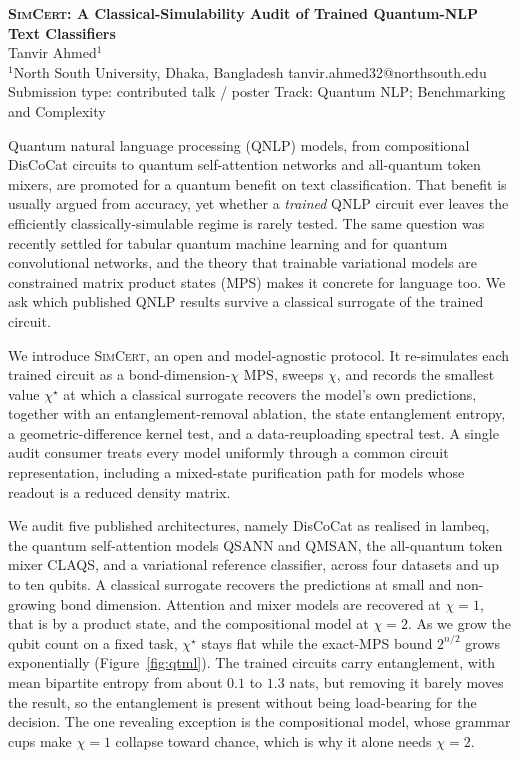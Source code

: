 \documentclass[11pt]{article}
\begin{document}
\begin{center}
{\Large\bfseries \textsc{SimCert}: A Classical-Simulability Audit of Trained Quantum-NLP Text Classifiers}\\[6pt]
{\normalsize Tanvir Ahmed$^{1}$}\\[2pt]
{\small $^{1}$North South University, Dhaka, Bangladesh \quad\textbullet\quad tanvir.ahmed32@northsouth.edu}\\[2pt]
{\small Submission type: contributed talk / poster \quad\textbullet\quad Track: Quantum NLP; Benchmarking and Complexity}
\end{center}
\vspace{2pt}

Quantum natural language processing (QNLP) models, from compositional DisCoCat circuits to
quantum self-attention networks and all-quantum token mixers, are promoted for a quantum benefit
on text classification. That benefit is usually argued from accuracy, yet whether a \emph{trained}
QNLP circuit ever leaves the efficiently classically-simulable regime is rarely tested. The same
question was recently settled for tabular quantum machine learning and for quantum convolutional
networks, and the theory that trainable variational models are constrained matrix product states
(MPS) makes it concrete for language too. We ask which published QNLP results survive a classical
surrogate of the trained circuit.

We introduce \textsc{SimCert}, an open and model-agnostic protocol. It re-simulates each trained
circuit as a bond-dimension-$\chi$ MPS, sweeps $\chi$, and records the smallest value $\chi^\star$
at which a classical surrogate recovers the model's own predictions, together with an
entanglement-removal ablation, the state entanglement entropy, a geometric-difference kernel test,
and a data-reuploading spectral test. A single audit consumer treats every model uniformly through
a common circuit representation, including a mixed-state purification path for models whose readout
is a reduced density matrix.

We audit five published architectures, namely DisCoCat as realised in lambeq, the quantum
self-attention models QSANN and QMSAN, the all-quantum token mixer CLAQS, and a variational
reference classifier, across four datasets and up to ten qubits. A classical surrogate recovers the
predictions at small and non-growing bond dimension. Attention and mixer models are recovered at
$\chi{=}1$, that is by a product state, and the compositional model at $\chi{=}2$. As we grow the
qubit count on a fixed task, $\chi^\star$ stays flat while the exact-MPS bound $2^{n/2}$ grows
exponentially (Figure~\ref{fig:qtml}). The trained circuits carry entanglement, with mean bipartite
entropy from about $0.1$ to $1.3$ nats, but removing it barely moves the result, so the entanglement
is present without being load-bearing for the decision. The one revealing exception is the
compositional model, whose grammar cups make $\chi{=}1$ collapse toward chance, which is why it alone
needs $\chi{=}2$.
\end{document}
